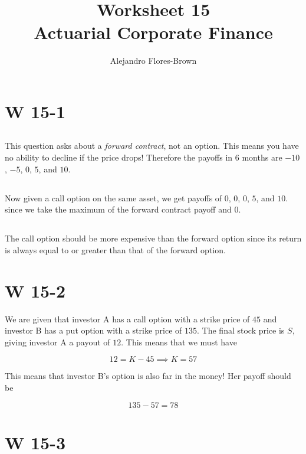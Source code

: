 \documentclass[12pt, letterpaper]{article}
\title{Worksheet 15 \\ Actuarial Corporate Finance}
\author{Alejandro Flores-Brown}
\begin{document}
    \maketitle

    \section{W 15-1}

    \subsection{}

    This question asks about a \emph{forward contract}, not an option. This means you have no ability to decline if the price drops! Therefore the payoffs in \(6\) months are \(-10\), \(-5\), \(0\), \(5\), and \(10\). 

    \subsection{}

    Now given a call option on the same asset, we get payoffs of \(0\), \(0\), \(0\), \(5\), and \(10\). since we take the maximum of the forward contract payoff and \(0\).

    \subsection{}

    The call option should be more expensive than the forward option since its return is always equal to or greater than that of the forward option.

    \section{W 15-2}

    We are given that investor A has a call option with a strike price of \(45\) and investor B has a put option with a strike price of \(135\). The final stock price is \(S\), giving investor A a payout of \(12\). This means that we must have

    \[ 12 = K - 45 \implies K = 57    \]

    This means that investor B's option is also far in the money! Her payoff should be 

    \[ 135 - 57 = 78     \]

    \section{W 15-3}
\end{document}
